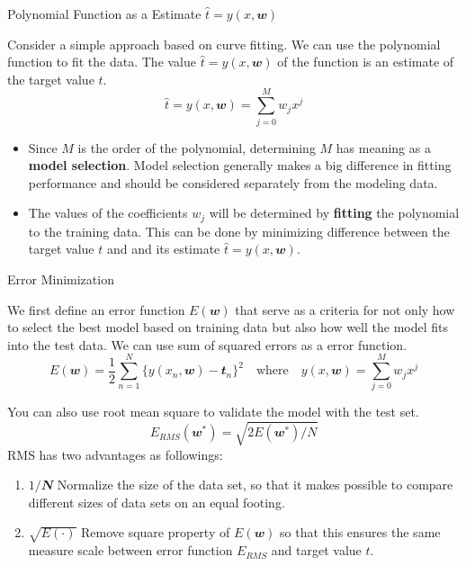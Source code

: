 \documentclass{bredelebeamer}
\begin{document}
\begin{frame}{Polynomial Function as a Estimate $\hat{t}=y(\mathit{x},\mathbfit{w})$}
  \begin{justify}
    Consider a simple approach based on curve fitting. We can use the polynomial
    function to fit the data. The value $\hat{t}=y(\mathit{x},\mathbfit{w})$ of
    the function is an estimate of the target value $t$.
    \begin{equation}
      \hat{t} = y(\mathit{x}, \mathbfit{w}) = \sum_{j=0}^{M} {{w_j}{x^j}}
    \end{equation}
    \begin{itemize}
      \item Since $M$ is the order of the polynomial, determining $M$ has meaning
      as a \textbf{model selection}. Model selection generally makes a big difference
      in fitting performance and should be considered separately from the modeling data.
      \item The values of the coefficients $w_j$ will be determined by \textbf{fitting}
      the polynomial to the training data. This can be done by minimizing difference
      between the target value $t$ and and its estimate $\hat{t}=y(\mathit{x},\mathbfit{w})$.
    \end{itemize}
  \end{justify}

\end{frame}

\begin{frame}{Error Minimization}
  \begin{justify}
    We first define an error function $E(\mathbfit{w})$ that serve as a criteria
    for not only how to select the best model based on training data but also how
    well the model fits into the test data. We can use sum of squared errors as a
    error function.
    \begin{equation}
      E(\mathbfit{w}) = \frac{1}{2}\sum_{n=1}^{N} { \{ y(\mathit{x}_\mathit{n},\mathbfit{w})-\mathbfit{t}_\mathit{n} \} }^{2}
      \quad \textrm{where} \quad y(\mathit{x}, \mathbfit{w})=\sum_{\mathit{j}=0}^{\mathit{M}} {{\mathit{w_j}}{\mathit{x^j}}}
    \end{equation}

    You can also use root mean square to validate the model with the test set.
    \begin{equation}
      E_{RMS}(\mathbfit{w}^{*}) = \sqrt{ {2} E(\mathbfit{w}^{*}) / {N} }
    \end{equation}
    RMS has two advantages as followings:
    \begin{enumerate}
      \item $\mathbfit{1/N}$ Normalize the size of the data set, so that it makes
            possible to compare different sizes of data sets on an equal footing.
      \item $\sqrt{E(\cdot)}$ Remove square property of $E(\mathbfit{w})$ so that
            this ensures the same measure scale between error function $E_{RMS}$
            and target value $\mathit{t}$.

    \end{enumerate}
  \end{justify}
\end{frame}
\end{document}
